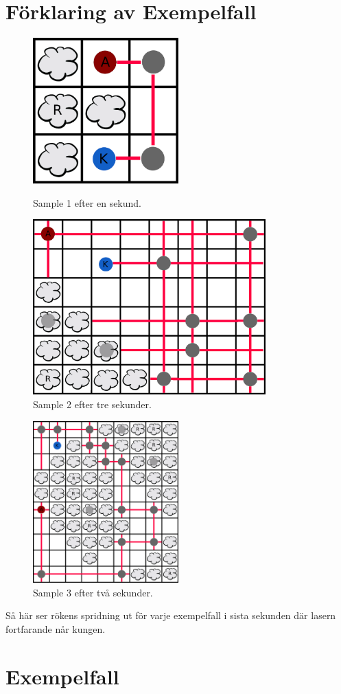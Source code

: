\section*{Förklaring av Exempelfall}
\begin{figure}
  \centering
  \begin{minipage}{.5\textwidth}
    \centering
    \includegraphics[width=0.5\textwidth]{sample1.png}
    \caption{Sample 1 efter en sekund.}
    \label{fig:test1}
  \end{minipage}%
  \begin{minipage}{.5\textwidth}
    \centering
    \includegraphics[width=0.8\textwidth]{sample2.png}
    \caption{Sample 2 efter tre sekunder.}
    \label{fig:test2}
  \end{minipage}
\end{figure}
\begin{figure}
    \centering
    \includegraphics[width=0.5\textwidth]{sample3.png}
    \caption{Sample 3 efter två sekunder.}
    \label{fig:test3}
\end{figure}

Så här ser rökens spridning ut för varje exempelfall i sista sekunden där lasern fortfarande når kungen.

\section*{Exempelfall}
